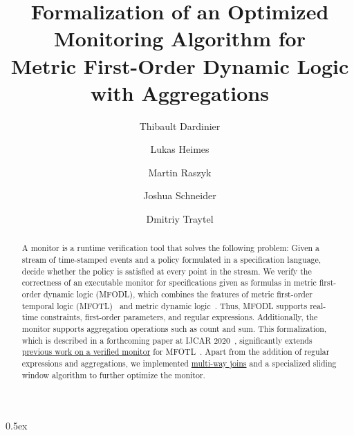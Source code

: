 \documentclass[10pt,a4paper]{article}
\begin{document}
\title{Formalization of an Optimized Monitoring Algorithm for\\ Metric First-Order Dynamic Logic with Aggregations}
\author{Thibault Dardinier \and Lukas Heimes \and Martin Raszyk \and Joshua Schneider \and Dmitriy Traytel}

\maketitle

\begin{abstract}
A monitor is a runtime verification tool that solves the following problem: Given a stream
of time-stamped events and a policy formulated in a specification language, decide
whether the policy is satisfied at every point in the stream. We verify the correctness
of an executable monitor for specifications given as formulas in metric first-order
dynamic logic (MFODL), which combines the features of metric first-order temporal logic
(MFOTL)~\cite{BasinKMZ-JACM15} and metric dynamic logic~\cite{BasinKT-RV17}. Thus, MFODL
supports real-time constraints, first-order parameters, and regular expressions.
Additionally, the monitor supports aggregation operations such as count and sum. This
formalization, which is described in a forthcoming paper at IJCAR
2020~\cite{BasinDHKRST2020IJCAR}, significantly extends
\href{https://www.isa-afp.org/entries/MFOTL_Monitor.html}{previous work on a verified
monitor} for MFOTL~\cite{SchneiderBKT2019RV}. Apart from the addition of regular
expressions and aggregations, we implemented
\href{https://www.isa-afp.org/entries/Generic_Join.html}{multi-way joins} and
a specialized sliding window algorithm to further optimize the monitor.
\end{abstract}

\tableofcontents

\parindent 0pt\parskip 0.5ex





\end{document}
